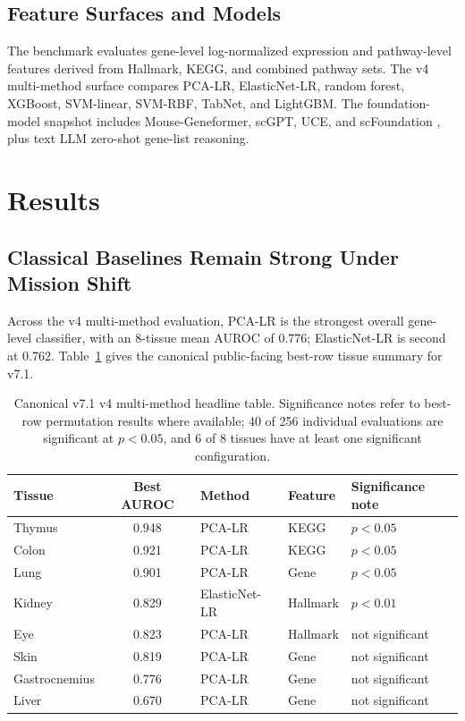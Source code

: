 \documentclass[11pt]{article}
\begin{document}
\subsection{Feature Surfaces and Models}

The benchmark evaluates gene-level log-normalized expression and pathway-level
features derived from Hallmark, KEGG, and combined pathway sets. The v4
multi-method surface compares PCA-LR, ElasticNet-LR, random forest, XGBoost,
SVM-linear, SVM-RBF, TabNet, and LightGBM. The foundation-model snapshot
includes Mouse-Geneformer, scGPT, UCE, and scFoundation
\citep{geneformer_todo,scgpt_todo,uce_todo,scfoundation_todo}, plus text LLM
zero-shot gene-list reasoning.

\section{Results}

\subsection{Classical Baselines Remain Strong Under Mission Shift}

Across the v4 multi-method evaluation, PCA-LR is the strongest overall
gene-level classifier, with an 8-tissue mean AUROC of 0.776; ElasticNet-LR is
second at 0.762. Table~\ref{tab:headline} gives the canonical public-facing
best-row tissue summary for v7.1.

\begin{table}[t]
\centering
\small
\caption{Canonical v7.1 v4 multi-method headline table. Significance notes
refer to best-row permutation results where available; 40 of 256 individual
evaluations are significant at $p<0.05$, and 6 of 8 tissues have at least one
significant configuration.}
\label{tab:headline}
\begin{tabular}{lclll}
\toprule
Tissue & Best AUROC & Method & Feature & Significance note \\
\midrule
Thymus & 0.948 & PCA-LR & KEGG & $p<0.05$ \\
Colon & 0.921 & PCA-LR & KEGG & $p<0.05$ \\
Lung & 0.901 & PCA-LR & Gene & $p<0.05$ \\
Kidney & 0.829 & ElasticNet-LR & Hallmark & $p<0.01$ \\
Eye & 0.823 & PCA-LR & Hallmark & not significant \\
Skin & 0.819 & PCA-LR & Gene & not significant \\
Gastrocnemius & 0.776 & PCA-LR & Gene & not significant \\
Liver & 0.670 & PCA-LR & Gene & not significant \\
\bottomrule
\end{tabular}
\end{table}
\end{document}
